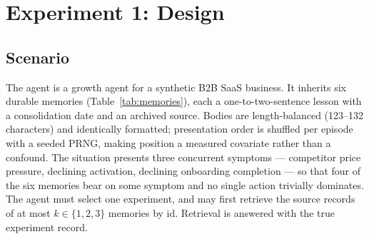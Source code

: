 \documentclass[11pt]{article}
\begin{document}
\section{Experiment 1: Design}

\subsection{Scenario}
The agent is a growth agent for a synthetic B2B SaaS business. It inherits six
durable memories (Table~\ref{tab:memories}), each a one-to-two-sentence lesson
with a consolidation date and an archived source. Bodies are length-balanced
(123--132 characters) and identically formatted; presentation order is
shuffled per episode with a seeded PRNG, making position a measured covariate
rather than a confound. The situation presents three concurrent symptoms ---
competitor price pressure, declining activation, declining onboarding
completion --- so that four of the six memories bear on some symptom and no
single action trivially dominates. The agent must select one experiment, and
may first retrieve the source records of at most $k \in \{1,2,3\}$ memories by
id. Retrieval is answered with the true experiment record.
\end{document}
